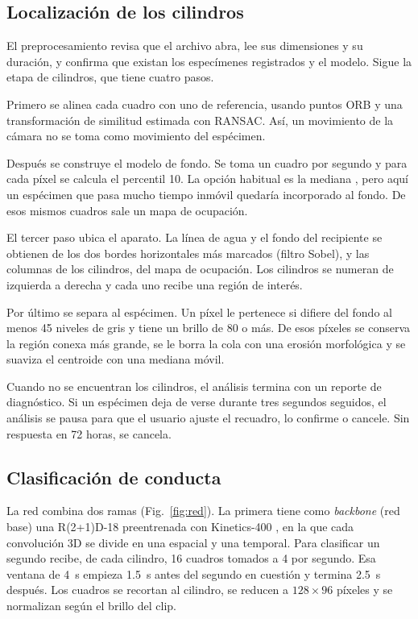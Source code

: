 \documentclass[conference,letterpaper]{IEEEtran}
\begin{document}
\subsection{Localización de los cilindros}

El preprocesamiento revisa que el archivo abra, lee sus dimensiones y su duración, y
confirma que existan los especímenes registrados y el modelo. Sigue la etapa de cilindros,
que tiene cuatro pasos.

Primero se alinea cada cuadro con uno de referencia, usando puntos ORB y una transformación
de similitud estimada con RANSAC. Así, un movimiento de la cámara no se toma como
movimiento del espécimen.

Después se construye el modelo de fondo. Se toma un cuadro por segundo y para cada píxel se
calcula el percentil 10. La opción habitual es la mediana \cite{piccardi}, pero aquí un
espécimen que pasa mucho tiempo inmóvil quedaría incorporado al fondo. De esos mismos
cuadros sale un mapa de ocupación.

El tercer paso ubica el aparato. La línea de agua y el fondo del recipiente se obtienen de
los dos bordes horizontales más marcados (filtro Sobel), y las columnas de los cilindros,
del mapa de ocupación. Los cilindros se numeran de izquierda a derecha y cada uno recibe una
región de interés.

Por último se separa al espécimen. Un píxel le pertenece si difiere del fondo al menos 45
niveles de gris y tiene un brillo de 80 o más. De esos píxeles se conserva la región conexa
más grande, se le borra la cola con una erosión morfológica y se suaviza el centroide con
una mediana móvil.

Cuando no se encuentran los cilindros, el análisis termina con un reporte de diagnóstico. Si
un espécimen deja de verse durante tres segundos seguidos, el análisis se pausa para que el
usuario ajuste el recuadro, lo confirme o cancele. Sin respuesta en 72 horas, se cancela.

\subsection{Clasificación de conducta}

La red combina dos ramas (Fig.~\ref{fig:red}). La primera tiene como \textit{backbone} (red
base) una R(2+1)D-18 preentrenada con Kinetics-400 \cite{tran}, en la que cada convolución
3D se divide en una espacial y una temporal. Para clasificar un segundo recibe, de cada
cilindro, 16 cuadros tomados a 4 por segundo. Esa ventana de 4~s empieza 1.5~s antes del
segundo en cuestión y termina 2.5~s después. Los cuadros se recortan al cilindro, se reducen
a $128\times96$ píxeles y se normalizan según el brillo del clip.
\end{document}
